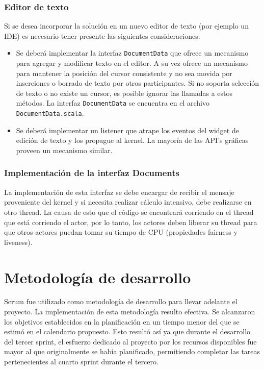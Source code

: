 \documentclass[12pt,a4paper]{article}
\let\stdsection\section
\renewcommand\section{\newpage\stdsection}
\begin{document}
\subsubsection{Editor de texto}
Si se desea incorporar la solución en un nuevo editor de texto (por ejemplo un IDE) es necesario tener presente 
las siguientes consideraciones:

	\begin{itemize}
		\item Se deberá implementar la interfaz \texttt{DocumentData} que ofrece un mecanismo para agregar y modificar texto en el editor. 
		A su vez ofrece un mecanismo para mantener la posición del cursor consistente y no sea movida por inserciones o
		borrado de texto por otros participantes. Si no soporta selección de texto o no existe un cursor, es posible ignorar
		las llamadas a estos métodos.
		La interfaz \texttt{DocumentData} se encuentra en el archivo \texttt{DocumentData.scala}.
		\item  Se deberá implementar un listener que atrape los eventos del widget de edición de texto y los propague al kernel.
		La mayoría de las API’s gráficas proveen un mecanismo similar.
	\end{itemize}


\subsubsection{Implementación de la interfaz Documents}
La implementación de esta interfaz se debe encargar de recibir el mensaje proveniente del kernel y si necesita realizar
cálculo intensivo, debe realizarse en otro thread. La causa de esto que el código se encontrará corriendo en el thread que
está corriendo el actor, por lo tanto, los actores deben liberar su thread para que otros actores puedan tomar su tiempo de CPU
(propiedades fairness y liveness).

\section{Metodología de desarrollo}

Scrum fue utilizado como metodología de desarrollo para llevar adelante el proyecto. La implementación de esta metodología resulto efectiva. Se alcanzaron los objetivos establecidos en la planificación en un tiempo menor 
del que se estimó en el calendario propuesto. Esto resultó así ya que durante el desarrollo del tercer sprint,
el esfuerzo dedicado al proyecto por los recursos disponibles fue mayor al que originalmente se había planificado, permitiendo completar las tareas pertenecientes al cuarto sprint durante el tercero.
\end{document}
